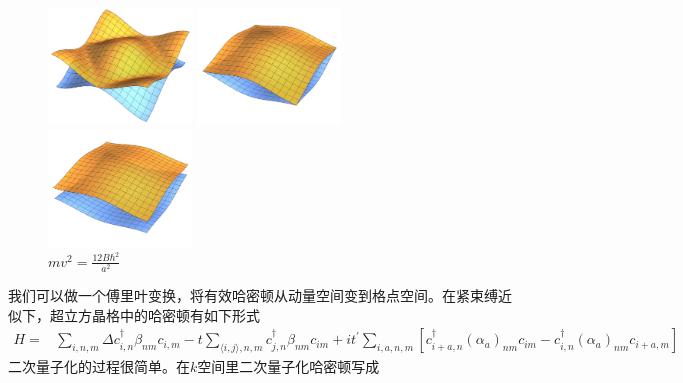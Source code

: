 \documentclass{article}
\numberwithin{equation}{subsection}
\begin{document}
\begin{figure}[h]
    \centering
    \begin{minipage}[c]{0.3\textwidth}
        \centering
        \includegraphics[width=1.5in]{dirac8m4.pdf}
        \caption{$mv^2=\frac{4B\hbar^2}{a^2}$}
    \end{minipage}
    \begin{minipage}[c]{0.3\textwidth}
        \centering
        \includegraphics[width=1.5in]{dirac8m8.pdf}
        \caption{$mv^2=\frac{8B\hbar^2}{a^2}$}
    \end{minipage}
    \begin{minipage}[c]{0.3\textwidth}
        \centering
        \includegraphics[width=1.5in]{dirac8m12.pdf}
        \caption{$mv^2=\frac{12B\hbar^2}{a^2}$}
    \end{minipage}
\end{figure}
我们可以做一个傅里叶变换，将有效哈密顿从动量空间变到格点空间。在紧束缚近似下，超立方晶格中的哈密顿有如下形式
\begin{equation}
    \begin{aligned}
        H=& \sum_{i, n, m} \Delta c_{i, n}^{\dagger} \beta_{n m} c_{i, m}-t \sum_{\langle i, j\rangle,n,m} c_{j, n}^{\dagger} \beta_{n m} c_{i m}+i t^{\prime} \sum_{i,a, n, m}\left[c_{i+a, n}^{\dagger}\left(\alpha_{a}\right)_{n m} c_{i m}-c_{i, n}^{\dagger}\left(\alpha_{a}\right)_{n m} c_{i+a, m}\right]
    \end{aligned}
\end{equation}
二次量子化的过程很简单。在$k$空间里二次量子化哈密顿写成
\end{document}

